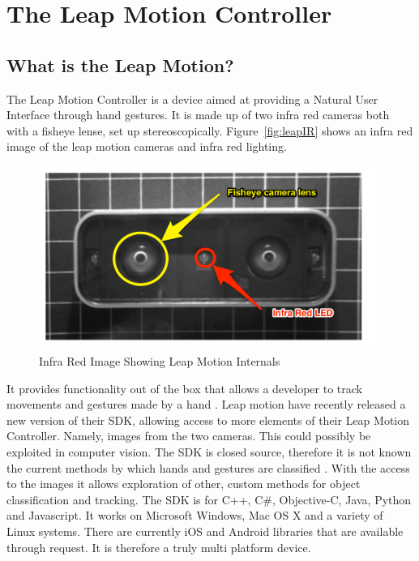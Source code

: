 \documentclass[11pt,oneside]{report}
\begin{document}
		\section{The Leap Motion Controller}
			\subsection{What is the Leap Motion?}
				The Leap Motion Controller is a device aimed at providing a Natural User Interface through hand gestures.
				It is made up of two infra red cameras both with a fisheye lense, set up stereoscopically.
				Figure~\ref{fig:leapIR} shows an infra red image of the leap motion cameras and infra red lighting.
				\begin{figure}[!ht]
				\begin{center}
					\includegraphics[width=\textwidth]{leap_ir.pdf}
					\caption{Infra Red Image Showing Leap Motion Internals\protect {\label{fig:leapIR}}}
				\end{center}
				\end{figure}
				It provides functionality out of the box that allows a developer to track movements and gestures made by a hand \cite{web:leapGestures}.
				Leap motion have recently released a new version of their SDK, allowing access to more elements of their Leap Motion Controller. 
				Namely, images from the two cameras. 
				This could possibly be exploited in computer vision. %
				The  SDK is closed source, therefore it is not known the current methods by which hands and gestures are classified \cite[p. 217]{journal:leapEvaluation}.
				With the access to the images it allows exploration of other, custom methods for object classification and tracking.
				The SDK is for C++, C\#, Objective-C, Java, Python and Javascript.
				It works on Microsoft Windows, Mac OS X and a variety of Linux systems.
				There are currently iOS and Android libraries that are available through request.
				It is therefore a truly multi platform device.
				
\end{document}
